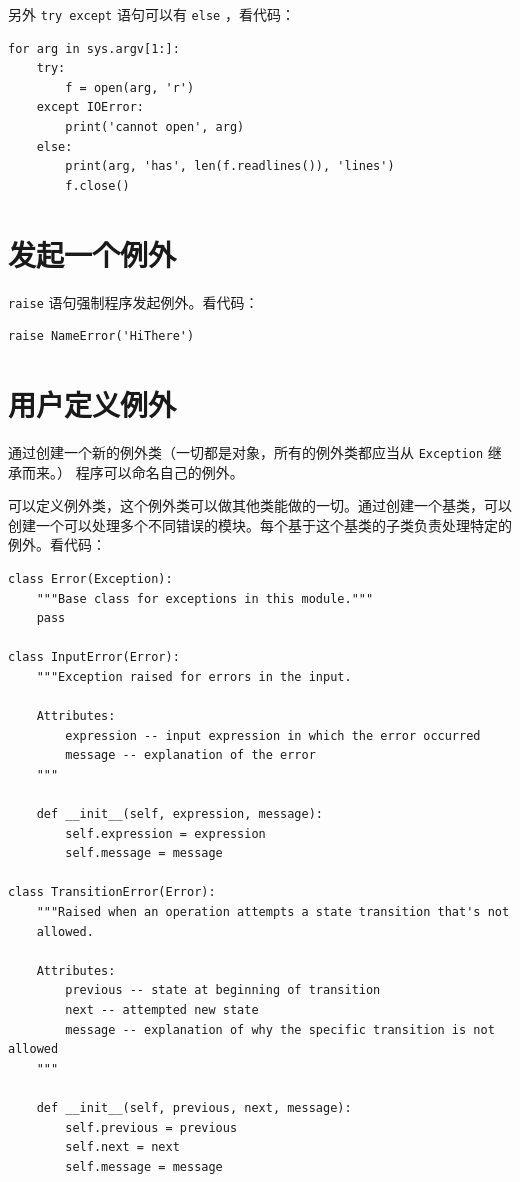 \documentclass[10pt,a4paper,UTF8]{article}
\begin{document}
另外 \texttt{try except} 语句可以有 \texttt{else} ，看代码：
\lstset{language=Python,label= ,caption= ,captionpos=b,numbers=none}
\begin{lstlisting}
for arg in sys.argv[1:]:
    try:
        f = open(arg, 'r')
    except IOError:
        print('cannot open', arg)
    else:
        print(arg, 'has', len(f.readlines()), 'lines')
        f.close()
\end{lstlisting}

\section{发起一个例外}
\label{sec:org970a446}


\texttt{raise} 语句强制程序发起例外。看代码：

\lstset{language=Python,label= ,caption= ,captionpos=b,numbers=none}
\begin{lstlisting}
raise NameError('HiThere')
\end{lstlisting}

\section{用户定义例外}
\label{sec:orgc74ee1d}


通过创建一个新的例外类（一切都是对象，所有的例外类都应当从 \texttt{Exception} 继承而来。） 程序可以命名自己的例外。 

可以定义例外类，这个例外类可以做其他类能做的一切。通过创建一个基类，可以创建一个可以处理多个不同错误的模块。每个基于这个基类的子类负责处理特定的例外。看代码：

\lstset{language=Python,label= ,caption= ,captionpos=b,numbers=none}
\begin{lstlisting}
class Error(Exception):
    """Base class for exceptions in this module."""
    pass

class InputError(Error):
    """Exception raised for errors in the input.

    Attributes:
        expression -- input expression in which the error occurred
        message -- explanation of the error
    """

    def __init__(self, expression, message):
        self.expression = expression
        self.message = message

class TransitionError(Error):
    """Raised when an operation attempts a state transition that's not
    allowed.

    Attributes:
        previous -- state at beginning of transition
        next -- attempted new state
        message -- explanation of why the specific transition is not allowed
    """

    def __init__(self, previous, next, message):
        self.previous = previous
        self.next = next
        self.message = message
\end{lstlisting}
\end{document}
